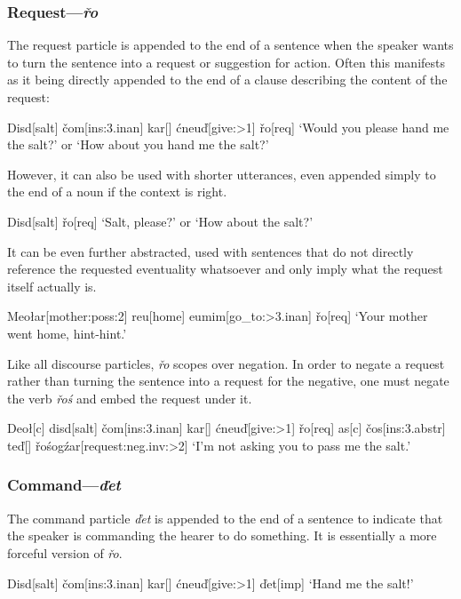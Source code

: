 \documentclass[a4paper,11pt,oneside,openany]{memoir}
\newcommand{\vd}{ď}
\newcommand{\vc}{č}
\newcommand{\vr}{ř}
\begin{document}
\subsubsection{Request---\textit{\vr o}}\label{sec:ro}

The request particle is appended to the end of a sentence when the speaker wants to turn the sentence into a request or suggestion for action. Often this manifests as it being directly appended to the end of a clause describing the content of the request:

\ex
\begingl
Disd[salt]
\vc om[\sc ins:3.inan]
kar[]
\'cneu\vd[give:{\sc >1}]
\vr o[\sc req]
\glft `Would you please hand me the salt?' or `How about you hand me the salt?'
\endgl
\xe

However, it can also be used with shorter utterances, even appended simply to the end of a noun if the context is right.

\ex
\begingl
Disd[salt]
\vr o[\sc req]
\glft `Salt, please?' or `How about the salt?'
\endgl
\xe

It can be even further abstracted, used with sentences that do not directly reference the requested eventuality whatsoever and only imply what the request itself actually is.

\ex
\begingl
Meo\l ar[mother:{\sc poss:2}]
reu[home]
eumim[go\_to:{\sc >3.inan}]
\vr o[\sc req]
\glft `Your mother went home, hint-hint.'
\endgl
\xe

Like all discourse particles, \textit{\vr o} scopes over negation. In order to negate a request rather than turning the sentence into a request for the negative, one must negate the verb \textit{\vr o\'s} and embed the request under it.

\ex
\begingl
Deo\l[\sc c]
disd[salt]
\vc om[\sc ins:3.inan]
kar[]
\'cneu\vd[give:{\sc >1}]
\vr o[\sc req]
\nogloss{,}
as[\sc c]
\vc os[\sc ins:3.abstr]
te\vd[]
\vr o\'sog\'zar[request:{\sc neg.inv:>2}]
\glft `I'm not asking you to pass me the salt.'
\endgl
\xe

\subsubsection{Command---\textit{\vd et}}

The command particle \textit{\vd et} is appended to the end of a sentence to indicate that the speaker is commanding the hearer to do something. It is essentially a more forceful version of \textit{\vr o}. 

\ex
\begingl
Disd[salt]
\vc om[\sc ins:3.inan]
kar[]
\'cneu\vd[give:{\sc >1}]
\vd et[\sc imp]
\glft `Hand me the salt!'
\endgl
\xe
\end{document}

